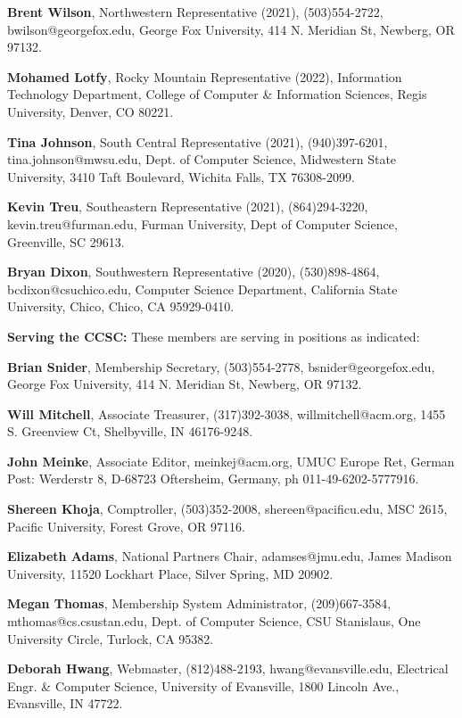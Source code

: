 \documentclass{article}
\begin{document}
\begin{multicols}{2}
\begin{raggedright}
\noindent
\textbf{Brent Wilson}, Northwestern Representative (2021), (503)554-2722,
bwilson@georgefox.edu, George Fox University, 414 N. Meridian St, Newberg,
OR 97132.

\noindent
\textbf{Mohamed Lotfy}, Rocky Mountain Representative (2022), Information
Technology Department, College of Computer \& Information Sciences, Regis
University, Denver, CO 80221.

\noindent
\textbf{Tina Johnson}, South Central Representative (2021), (940)397-6201,
tina.johnson@mwsu.edu, Dept. of Computer Science, Midwestern State University,
3410 Taft Boulevard, Wichita Falls, TX 76308-2099.

\clearpage

\noindent
\textbf{Kevin Treu}, Southeastern Representative (2021), (864)294-3220,
kevin.treu@furman.edu, Furman University, Dept of Computer Science, Greenville,
SC 29613.

\noindent
\textbf{Bryan Dixon}, Southwestern Representative (2020), (530)898-4864,
bcdixon@csuchico.edu, Computer Science Department, California State University,
Chico, Chico, CA 95929-0410.

\vspace{0.2in}
\noindent
\textbf{Serving the CCSC:} These members are serving in positions as indicated:

\noindent
\textbf{Brian Snider}, Membership Secretary, (503)554-2778,
bsnider@georgefox.edu, George Fox University, 414 N. Meridian St, Newberg,
OR 97132.

\noindent
\textbf{Will Mitchell}, Associate Treasurer, (317)392-3038,
willmitchell@acm.org, 1455 S. Greenview Ct, Shelbyville, IN 46176-9248.

\noindent
\textbf{John Meinke}, Associate Editor, meinkej@acm.org, UMUC Europe Ret,
German Post: Werderstr 8, D-68723 Oftersheim, Germany, ph 011-49-6202-5777916.

\noindent
\textbf{Shereen Khoja}, Comptroller, (503)352-2008, shereen@pacificu.edu,
MSC 2615, Pacific University, Forest Grove, OR 97116.

\noindent
\textbf{Elizabeth Adams}, National Partners Chair, adamses@jmu.edu,
James Madison University, 11520 Lockhart Place, Silver Spring, MD 20902.

\noindent
\textbf{Megan Thomas}, Membership System Administrator, (209)667-3584,
mthomas@cs.csustan.edu, Dept. of Computer Science, CSU Stanislaus,
One University Circle, Turlock, CA 95382.

\noindent
\textbf{Deborah Hwang}, Webmaster, (812)488-2193, hwang@evansville.edu,
Electrical Engr. \& Computer Science, University of Evansville,
1800 Lincoln Ave., Evansville, IN 47722.

\end{raggedright}
\end{multicols}
\end{document}
